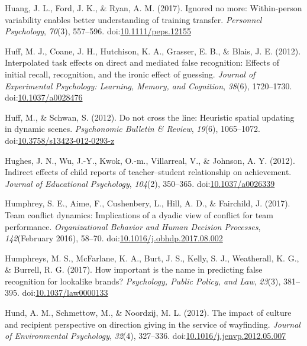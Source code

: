 \documentclass[english,man]{apa6}
\theoremstyle{definition}
\theoremstyle{definition}
\theoremstyle{definition}
\theoremstyle{remark}
\begin{document}
\hypertarget{ref-Huang2017}{}
Huang, J. L., Ford, J. K., \& Ryan, A. M. (2017). Ignored no more:
Within-person variability enables better understanding of training
transfer. \emph{Personnel Psychology}, \emph{70}(3), 557--596.
doi:\href{https://doi.org/10.1111/peps.12155}{10.1111/peps.12155}

\hypertarget{ref-Huff2012}{}
Huff, M. J., Coane, J. H., Hutchison, K. A., Grasser, E. B., \& Blais,
J. E. (2012). Interpolated task effects on direct and mediated false
recognition: Effects of initial recall, recognition, and the ironic
effect of guessing. \emph{Journal of Experimental Psychology: Learning,
Memory, and Cognition}, \emph{38}(6), 1720--1730.
doi:\href{https://doi.org/10.1037/a0028476}{10.1037/a0028476}

\hypertarget{ref-Huff2012a}{}
Huff, M., \& Schwan, S. (2012). Do not cross the line: Heuristic spatial
updating in dynamic scenes. \emph{Psychonomic Bulletin \& Review},
\emph{19}(6), 1065--1072.
doi:\href{https://doi.org/10.3758/s13423-012-0293-z}{10.3758/s13423-012-0293-z}

\hypertarget{ref-Hughes2012}{}
Hughes, J. N., Wu, J.-Y., Kwok, O.-m., Villarreal, V., \& Johnson, A. Y.
(2012). Indirect effects of child reports of teacher--student
relationship on achievement. \emph{Journal of Educational Psychology},
\emph{104}(2), 350--365.
doi:\href{https://doi.org/10.1037/a0026339}{10.1037/a0026339}

\hypertarget{ref-Humphrey2017}{}
Humphrey, S. E., Aime, F., Cushenbery, L., Hill, A. D., \& Fairchild, J.
(2017). Team conflict dynamics: Implications of a dyadic view of
conflict for team performance. \emph{Organizational Behavior and Human
Decision Processes}, \emph{142}(February 2016), 58--70.
doi:\href{https://doi.org/10.1016/j.obhdp.2017.08.002}{10.1016/j.obhdp.2017.08.002}

\hypertarget{ref-Humphreys2017}{}
Humphreys, M. S., McFarlane, K. A., Burt, J. S., Kelly, S. J.,
Weatherall, K. G., \& Burrell, R. G. (2017). How important is the name
in predicting false recognition for lookalike brands? \emph{Psychology,
Public Policy, and Law}, \emph{23}(3), 381--395.
doi:\href{https://doi.org/10.1037/law0000133}{10.1037/law0000133}

\hypertarget{ref-Hund2012}{}
Hund, A. M., Schmettow, M., \& Noordzij, M. L. (2012). The impact of
culture and recipient perspective on direction giving in the service of
wayfinding. \emph{Journal of Environmental Psychology}, \emph{32}(4),
327--336.
doi:\href{https://doi.org/10.1016/j.jenvp.2012.05.007}{10.1016/j.jenvp.2012.05.007}
\end{document}
